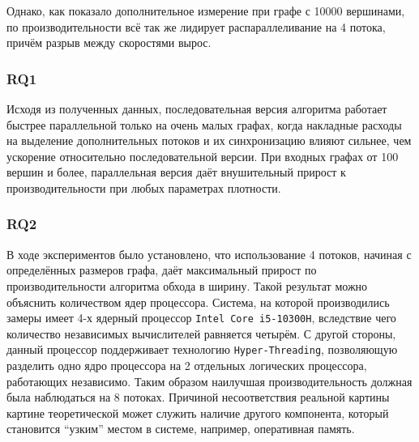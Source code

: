 \begin{table}[h]
\centering
    \caption{Сравнение производительности алгоритма обхода в ширину при использовании 4 и 8 потоков для функции умножения.}
    \label{bfsmaxgraph}
\end{table}

Однако, как показало дополнительное измерение при графе с 10000 вершинами, по производительности всё так же лидирует распараллеливание на 4 потока, причём разрыв между скоростями вырос.

\subsubsection{RQ1} Исходя из полученных данных, последовательная версия алгоритма работает быстрее параллельной только на очень малых графах, когда накладные расходы на выделение дополнительных потоков и их синхронизацию влияют сильнее, чем ускорение относительно последовательной версии. При входных графах от 100 вершин и более, параллельная версия даёт внушительный прирост к производительности при любых параметрах плотности.
\subsubsection{RQ2} В ходе экспериментов было установлено, что использование 4 потоков, начиная с определённых размеров графа, даёт максимальный прирост по производительности алгоритма обхода в ширину. Такой результат можно объяснить количеством ядер процессора. Система, на которой производились замеры имеет 4-х ядерный процессор \texttt{Intel Core i5-10300H}, вследствие чего количество независимых вычислителей равняется четырём. С другой стороны, данный процессор поддерживает технологию \texttt{Hyper-Threading}, позволяющую разделить одно ядро процессора на 2 отдельных логических процессора, работающих независимо. Таким образом наилучшая производительность должная была наблюдаться на 8 потоках. Причиной несоответствия реальной картины картине теоретической может служить наличие другого компонента, который становится \enquote{узким} местом в системе, например, оперативная память.

